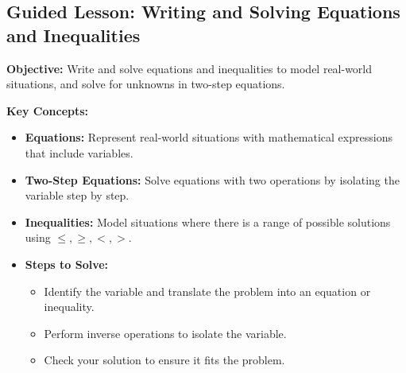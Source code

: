 \documentclass[12pt]{article}
\title{}
\date{}
\begin{document}
\subsection*{Guided Lesson: Writing and Solving Equations and Inequalities}
\onehalfspacing

\begin{tcolorbox}[colframe=black!40, colback=gray!5, 
coltitle=black, colbacktitle=black!20, fonttitle=\bfseries\Large, 
title=Learning Objective, halign title=center, left=5pt, right=5pt, top=5pt, bottom=15pt]
\textbf{Objective:} Write and solve equations and inequalities to model real-world situations, and solve for unknowns in two-step equations.
\end{tcolorbox}

\vspace{1em}

\begin{tcolorbox}[colframe=black!60, colback=white, 
coltitle=black, colbacktitle=black!15, fonttitle=\bfseries\Large, 
title=Key Concepts and Vocabulary, halign title=center, left=10pt, right=10pt, top=10pt, bottom=15pt]
\textbf{Key Concepts:}
\begin{itemize}
    \item \textbf{Equations:} Represent real-world situations with mathematical expressions that include variables.
    \item \textbf{Two-Step Equations:} Solve equations with two operations by isolating the variable step by step.
    \item \textbf{Inequalities:} Model situations where there is a range of possible solutions using \( \leq, \geq, <, > \).
    \item \textbf{Steps to Solve:}
    \begin{itemize}
        \item Identify the variable and translate the problem into an equation or inequality.
        \item Perform inverse operations to isolate the variable.
        \item Check your solution to ensure it fits the problem.
    \end{itemize}
\end{itemize}
\end{tcolorbox}

\vspace{1em}
\end{document}
